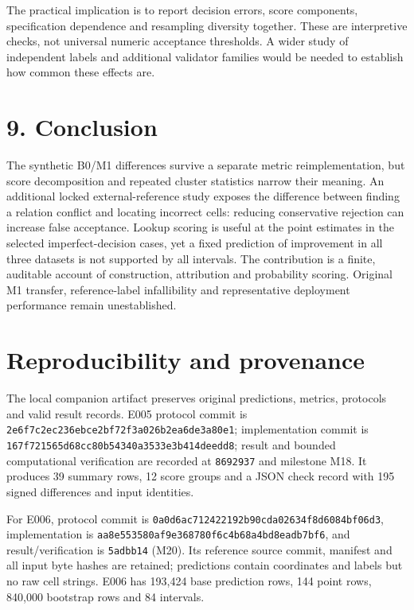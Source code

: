 The practical implication is to report decision errors, score
components, specification dependence and resampling diversity together.
These are interpretive checks, not universal numeric acceptance
thresholds. A wider study of independent labels and additional validator
families would be needed to establish how common these effects are.

\hypertarget{conclusion}{%
\section{9. Conclusion}\label{conclusion}}

The synthetic B0/M1 differences survive a separate metric
reimplementation, but score decomposition and repeated cluster
statistics narrow their meaning. An additional locked external-reference
study exposes the difference between finding a relation conflict and
locating incorrect cells: reducing conservative rejection can increase
false acceptance. Lookup scoring is useful at the point estimates in the
selected imperfect-decision cases, yet a fixed prediction of improvement
in all three datasets is not supported by all intervals. The
contribution is a finite, auditable account of construction, attribution
and probability scoring. Original M1 transfer, reference-label
infallibility and representative deployment performance remain
unestablished.

\hypertarget{reproducibility-and-provenance}{%
\section{Reproducibility and
provenance}\label{reproducibility-and-provenance}}

The local companion artifact preserves original predictions, metrics,
protocols and valid result records. E005 protocol commit is
\texttt{2e6f7c2ec236ebce2bf72f3a026b2ea6de3a80e1}; implementation commit
is \texttt{167f721565d68cc80b54340a3533e3b414deedd8}; result and bounded
computational verification are recorded at \texttt{8692937} and
milestone M18. It produces 39 summary rows, 12 score groups and a JSON
check record with 195 signed differences and input identities.

For E006, protocol commit is
\texttt{0a0d6ac712422192b90cda02634f8d6084bf06d3}, implementation is
\texttt{aa8e553580af9e368780f6c4b68a4bd8eadb7bf6}, and
result/verification is \texttt{5adbb14} (M20). Its reference source
commit, manifest and all input byte hashes are retained; predictions
contain coordinates and labels but no raw cell strings. E006 has 193,424
base prediction rows, 144 point rows, 840,000 bootstrap rows and 84
intervals.

